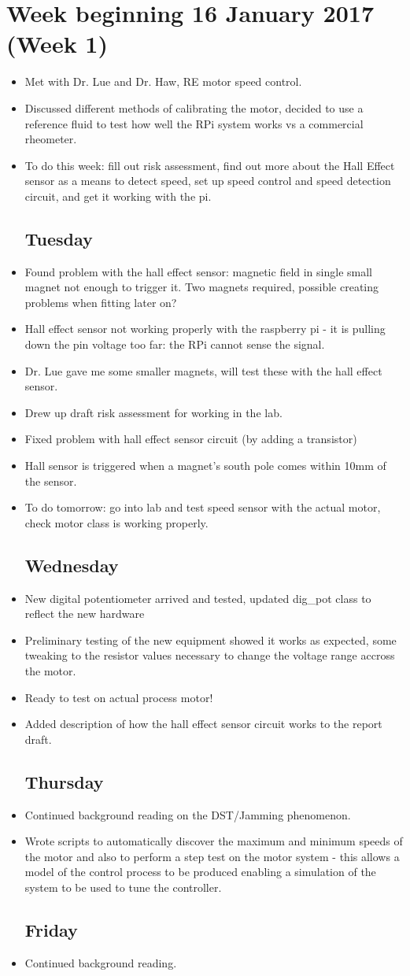 \documentclass[a4]{report}
\def\mon{\subsection*{Monday}}
\def\tue{\subsection*{Tuesday}}
\def\wed{\subsection*{Wednesday}}
\def\thu{\subsection*{Thursday}}
\def\fri{\subsection*{Friday}}
\begin{document}
	\section{Week beginning 16 January 2017 (Week 1)}
	\begin{itemize}
		\mon
		\item Met with Dr. Lue and Dr. Haw, RE motor speed control.
		\item Discussed different methods of calibrating the motor, decided to use a reference fluid to test how well the RPi system works vs a commercial rheometer.
		\item  To do this week: fill out risk assessment, find out more about the Hall Effect sensor as a means to detect speed, set up speed control and speed detection circuit, and get it working with the pi.
		\tue
		\item Found problem with the hall effect sensor: magnetic field in single small magnet not enough to trigger it. Two magnets required, possible creating problems when fitting later on?
		\item Hall effect sensor not working properly with the raspberry pi - it is pulling down the pin voltage too far: the RPi cannot sense the signal.
		\item Dr. Lue gave me some smaller magnets, will test these with the hall effect sensor.
		\item Drew up draft risk assessment for working in the lab.
		\item Fixed problem with hall effect sensor circuit (by adding a transistor)
		\item Hall sensor is triggered when a magnet's south pole comes within 10mm of the sensor.
		\item To do tomorrow: go into lab and test speed sensor with the actual motor, check motor class is working properly.
		\wed
		\item New digital potentiometer arrived and tested, updated dig\_pot class to reflect the new hardware
		\item Preliminary testing of the new equipment showed it works as expected, some tweaking to the resistor values necessary to change the voltage range accross the motor. 
		\item Ready to test on actual process motor!
		\item Added description of how the hall effect sensor circuit works to the report draft.
		\thu
		\item Continued background reading on the DST/Jamming phenomenon.
		\item Wrote scripts to automatically discover the maximum and minimum speeds of the motor and also to perform a step test on the motor system - this allows a model of the control process to be produced enabling a simulation of the system to be used to tune the controller.
		\fri
		\item Continued background reading.
	\end{itemize}
	\newpage
\end{document}
